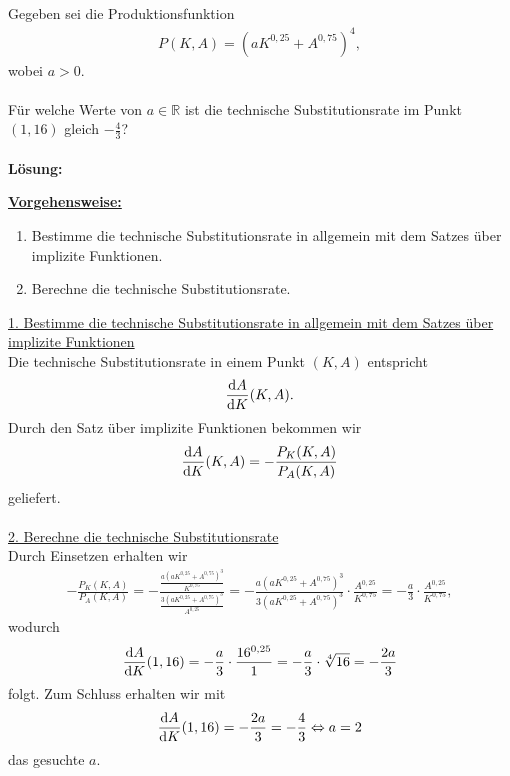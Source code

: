\subsection*{}
Gegeben sei die Produktionsfunktion
\begin{align*}
P(K,A) = (a K^{0,25} + A^{0,75})^4,
\end{align*}
wobei $a > 0$.\\
\\
Für welche Werte von $a \in \mathbb{R}$ ist die technische Substitutionsrate im Punkt $(1,16)$ gleich $-\frac{4}{3}$?
\\
\\
\textbf{Lösung:}
\begin{mdframed}
\underline{\textbf{Vorgehensweise:}}
\begin{enumerate}
\item Bestimme die technische Substitutionsrate in allgemein mit dem Satzes über implizite Funktionen.
\item Berechne die technische Substitutionsrate.
\end{enumerate}
\end{mdframed}

\underline{1. Bestimme die technische Substitutionsrate in allgemein mit dem Satzes über implizite Funktionen}\\
Die technische Substitutionsrate in einem Punkt $(K,A)$ entspricht
\begin{align*}
\frac{\text{\rmfamily d} A}{\text{\rmfamily d} K}(K,A).
\end{align*}
Durch den Satz über implizite Funktionen bekommen wir
\begin{align*}
\frac{\text{\rmfamily d} A}{\text{\rmfamily d} K}(K,A) 
= -\frac{P_K(K,A)}{P_A(K,A)}
\end{align*}
geliefert.\\
\\

\underline{2. Berechne die technische Substitutionsrate}\\
Durch Einsetzen erhalten wir
\begin{align*}
-\frac{P_K(K,A)}{P_A(K,A)} 
= -\frac{\frac{a \left( a K^{0,25} + A^{0,75}\right)^3 }{K^{0,75}}}{\frac{3 \left( a K^{0,25} + A^{0,75}\right)^3}{A^{0,25}}}
= -\frac{a \left( a K^{0,25} + A^{0,75}\right)^3}{3 \left( a K^{0,25} + A^{0,75}\right)^3}
\cdot \frac{A^{0,25}}{K^{0,75}}
=-\frac{a}{3} \cdot \frac{A^{0,25}}{K^{0,75}},
\end{align*}
wodurch
\begin{align*}
\frac{\text{\rmfamily d} A}{\text{\rmfamily d} K}(1,16) 
= -\frac{a}{3} \cdot \frac{16^{0,25}}{1} 
= -\frac{a}{3} \cdot \sqrt[4]{16} = -\frac{2a}{3}
\end{align*}
folgt. Zum Schluss erhalten wir mit 
\begin{align*}
\frac{\text{\rmfamily d} A}{\text{\rmfamily d} K}(1,16) = -\frac{2a}{3} = - \frac{4}{3}
\Leftrightarrow a = 2
\end{align*}
das gesuchte $a$.
